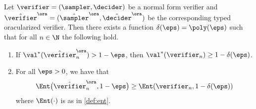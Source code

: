 \begin{theorem}
  \label{thm:oracle-soundness}
  Let $\verifier = (\sampler, \decider)$ be a normal form verifier and
  $\tvora = (\tsora,\tdora)$ be the corresponding typed
  oracularized verifier.
  Then there exists a function $\delta(\eps) = \poly(\eps)$ such that for all $n
  \in \N$ the following hold.
  \begin{enumerate}
  \item If $\val^*(\tvora_n) > 1 - \eps$, then $\val^*(\verifier_n) \geq
    1 - \delta(\eps)$.
	\item For all $\eps > 0$, we have that
    \begin{equation*}
      \Ent \bigl( \tvora_n, 1 - \eps \bigr) \geq
      \Ent(\verifier_{n}, 1 - \delta(\eps))
    \end{equation*}
    where $\Ent(\cdot)$ is as in \cref{def:ent}.
  \end{enumerate}
\end{theorem}

